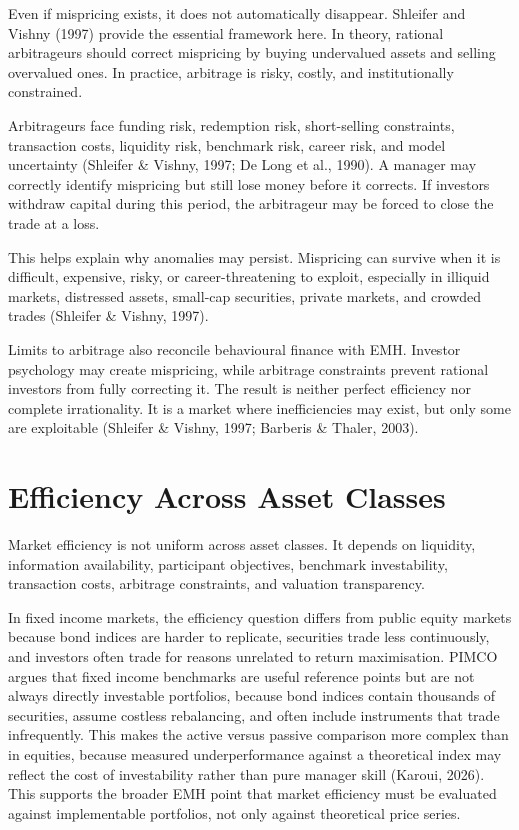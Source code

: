 \documentclass[11pt,a4paper]{article}
\begin{document}
Even if mispricing exists, it does not automatically disappear. Shleifer and Vishny (1997) provide the essential framework here. In theory, rational arbitrageurs should correct mispricing by buying undervalued assets and selling overvalued ones. In practice, arbitrage is risky, costly, and institutionally constrained.

Arbitrageurs face funding risk, redemption risk, short-selling constraints, transaction costs, liquidity risk, benchmark risk, career risk, and model uncertainty (Shleifer \& Vishny, 1997; De Long et al., 1990). A manager may correctly identify mispricing but still lose money before it corrects. If investors withdraw capital during this period, the arbitrageur may be forced to close the trade at a loss.

This helps explain why anomalies may persist. Mispricing can survive when it is difficult, expensive, risky, or career-threatening to exploit, especially in illiquid markets, distressed assets, small-cap securities, private markets, and crowded trades (Shleifer \& Vishny, 1997).

Limits to arbitrage also reconcile behavioural finance with EMH. Investor psychology may create mispricing, while arbitrage constraints prevent rational investors from fully correcting it. The result is neither perfect efficiency nor complete irrationality. It is a market where inefficiencies may exist, but only some are exploitable (Shleifer \& Vishny, 1997; Barberis \& Thaler, 2003).

\section{Efficiency Across Asset Classes}

Market efficiency is not uniform across asset classes. It depends on liquidity, information availability, participant objectives, benchmark investability, transaction costs, arbitrage constraints, and valuation transparency.

In fixed income markets, the efficiency question differs from public equity markets because bond indices are harder to replicate, securities trade less continuously, and investors often trade for reasons unrelated to return maximisation. PIMCO argues that fixed income benchmarks are useful reference points but are not always directly investable portfolios, because bond indices contain thousands of securities, assume costless rebalancing, and often include instruments that trade infrequently. This makes the active versus passive comparison more complex than in equities, because measured underperformance against a theoretical index may reflect the cost of investability rather than pure manager skill (Karoui, 2026). This supports the broader EMH point that market efficiency must be evaluated against implementable portfolios, not only against theoretical price series.
\end{document}
